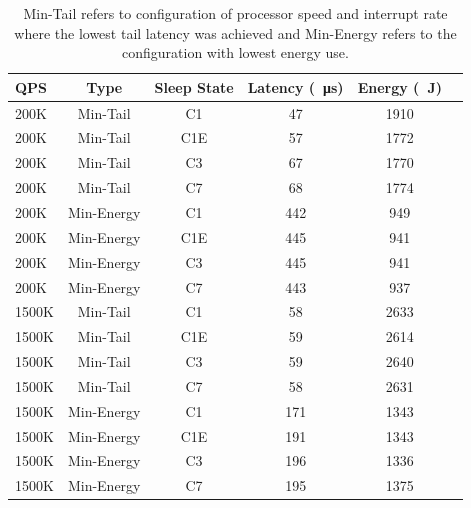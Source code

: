 \begin{table}[t]
\centering
\begin{tabular}{l|c|c|c|c|c|}
  QPS & Type & Sleep State & Latency (\SI{}{\micro s}) & Energy (\SI{}{\joule})\\ \hline
  200K & Min-Tail & C1 & 47 & 1910\\ \hline
  200K & Min-Tail & C1E & 57 & 1772\\ \hline
  200K & Min-Tail & C3 & 67 & 1770\\ \hline
  200K & Min-Tail & C7 & 68 & 1774\\ \hline
  200K & Min-Energy & C1 & 442 & 949\\ \hline
  200K & Min-Energy & C1E & 445 & 941\\ \hline
  200K & Min-Energy & C3 & 445 & 941\\ \hline
  200K & Min-Energy & C7 & 443 & 937\\ \hline
  1500K & Min-Tail & C1 & 58 & 2633\\ \hline
  1500K & Min-Tail & C1E & 59 & 2614\\ \hline
  1500K & Min-Tail & C3 & 59 & 2640\\ \hline
  1500K & Min-Tail & C7 & 58 & 2631\\ \hline
  1500K & Min-Energy & C1 & 171 & 1343 \\ \hline
  1500K & Min-Energy & C1E & 191 & 1343\\ \hline
  1500K & Min-Energy & C3 & 196 & 1336\\ \hline
  1500K & Min-Energy & C7 & 195 & 1375\\ \hline
\end{tabular}
\caption{Min-Tail refers to configuration of processor speed and interrupt rate where the lowest tail latency was achieved and Min-Energy refers to the configuration with lowest energy use.}
\label{table:mcd_sleep_states}	
\end{table}

